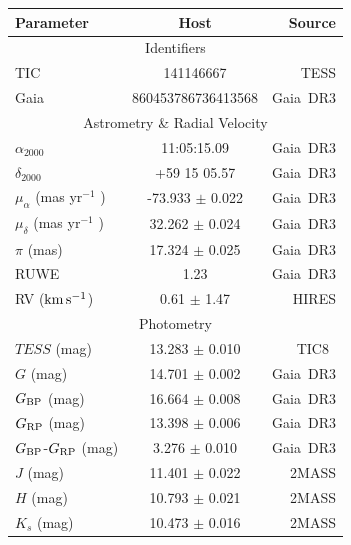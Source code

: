 \documentclass{nature3}
\newcommand{\kms}{\ensuremath{\rm km\,s^{-1}}}
\begin{document}
\begin{methods}

%
\begin{table}
    \centering
    \begin{tabular}{lcr}
    \hline 
    \hline
    Parameter & Host & Source \\
    \hline 
    \multicolumn{3}{c}{Identifiers} \\
    \hline
    TIC & 141146667 & TESS \\
    Gaia & 860453786736413568 & Gaia\ DR3 \\
    \hline
    \multicolumn{3}{c}{Astrometry \& Radial Velocity} \\ 
    \hline
    $\alpha_{2000}$ & 11:05:15.09   & Gaia\ DR3 \\
    $\delta_{2000}$ & +59 15 05.57  & Gaia\ DR3 \\
    $\mu_{\alpha}$ (mas yr$^{-1}$ ) & -73.933 $\pm$ 0.022 & Gaia\ DR3 \\
    $\mu_{\delta}$ (mas yr$^{-1}$ ) &  32.262 $\pm$ 0.024 & Gaia\ DR3 \\
    $\pi$ (mas)                     &  17.324 $\pm$ 0.025 & Gaia\ DR3 \\
    RUWE                            &  1.23               & Gaia\ DR3 \\
    RV (\kms)                       & 0.61 $\pm$ 1.47     & HIRES \\
    \hline
    \multicolumn{3}{c}{Photometry} \\
    \hline
    $TESS$ (mag)                    & 13.283 $\pm$ 0.010 & TIC8\     \\
    $G$ (mag)                       & 14.701 $\pm$ 0.002 & Gaia\ DR3 \\
    $G_{\rm BP}$ (mag)              & 16.664 $\pm$ 0.008 & Gaia\ DR3 \\
    $G_{\rm RP}$ (mag)              & 13.398 $\pm$ 0.006 & Gaia\ DR3 \\
    $G_{\rm BP}$-$G_{\rm RP}$ (mag) &  3.276 $\pm$ 0.010 & Gaia\ DR3 \\
    $J$ (mag)                       & 11.401 $\pm$ 0.022 & 2MASS     \\
    $H$ (mag)                       & 10.793 $\pm$ 0.021 & 2MASS     \\
    $K_s$ (mag)                     & 10.473 $\pm$ 0.016 & 2MASS     \\

\end{tabular}
\end{table}
\end{methods}
\end{document}
